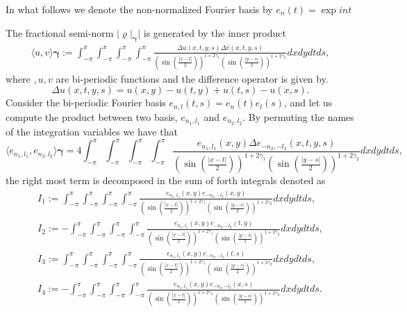 \documentclass{article}
\begin{document}
In what follows we denote the non-normalized Fourier basis by $e_n(t) = \exp{i n t }$

The fractional semi-norm $|\varrho|_{\mathbf{\gamma}}|$ is generated by the inner product 
\begin{align*}
\langle u , v \rangle{\mathbf{\gamma}} := \int_{-\pi}^{\pi}  \int_{-\pi}^{\pi} \int_{-\pi}^{\pi}\int_{-\pi}^{\pi} \frac{\Delta u (x,t,y,s)\Delta \overline{v} (x,t,y,s) }
{\left(\sin\left(\frac{|x-t|}{2}\right)\right)^{1+2\gamma_1}\left(\sin\left(\frac{|y-s|}{2}\right)\right)^{1+2\gamma_2}}dx dy dt ds, 
\end{align*}
where $,u,v$ are bi-periodic functions and the difference operator is given by.
$$\Delta u(x,t,y,s) = u(x,y)-u(t,y)+u(t,s)-u(x,s).$$
Consider the bi-periodic Fourier basis 
$e_{n,l}(t,s) = e_n(t)e_l(s)$, and let us compute the product between two basis, $e_{n_1,l_1}$ and $e_{n_2,l_2}$.  By permuting the names of the integration variables we have that 
$$\langle e_{n_1,l_1} , e_{n_2,l_2} \rangle{\mathbf{\gamma}}  =
4 \int_{-\pi}^{\pi}  \int_{-\pi}^{\pi} \int_{-\pi}^{\pi}\int_{-\pi}^{\pi} \frac{e_{n_1,l_1}(x,y)\Delta e_{-n_2,-l_2} (x,t,y,s) }
{\left(\sin\left(\frac{|x-t|}{2}\right)\right)^{1+2\gamma_1}\left(\sin\left(\frac{|y-s|}{2}\right)\right)^{1+2\gamma_2}}dx dy dt ds, 
$$
the right most term is decomposed in the sum of forth integrals denoted as
\begin{align*}
I_1 := \int_{-\pi}^{\pi}\int_{-\pi}^{\pi} \int_{-\pi}^{\pi}\int_{-\pi}^{\pi} \frac{e_{n_1,l_1}(x,y)e_{-n_2,-l_2} (x,y) }
{\left(\sin\left(\frac{|x-t|}{2}\right)\right)^{1+2\gamma_1}\left(\sin\left(\frac{|y-s|}{2}\right)\right)^{1+2\gamma_2}}dx dy dt ds,\\
I_2 :=  -\int_{-\pi}^{\pi}\int_{-\pi}^{\pi} \int_{-\pi}^{\pi}\int_{-\pi}^{\pi} \frac{e_{n_1,l_1}(x,y)e_{-n_2,-l_2} (t,y) }
{\left(\sin\left(\frac{|x-t|}{2}\right)\right)^{1+2\gamma_1}\left(\sin\left(\frac{|y-s|}{2}\right)\right)^{1+2\gamma_2}}dx dy dt ds,\\
I_3 := \int_{-\pi}^{\pi}\int_{-\pi}^{\pi} \int_{-\pi}^{\pi}\int_{-\pi}^{\pi} \frac{e_{n_1,l_1}(x,y)e_{-n_2,-l_2} (t,s) }
{\left(\sin\left(\frac{|x-t|}{2}\right)\right)^{1+2\gamma_1}\left(\sin\left(\frac{|y-s|}{2}\right)\right)^{1+2\gamma_2}}dx dy dt ds,\\
I_4 := -\int_{-\pi}^{\pi}\int_{-\pi}^{\pi} \int_{-\pi}^{\pi}\int_{-\pi}^{\pi} \frac{e_{n_1,l_1}(x,y)e_{-n_2,-l_2} (x,s) }
{\left(\sin\left(\frac{|x-t|}{2}\right)\right)^{1+2\gamma_1}\left(\sin\left(\frac{|y-s|}{2}\right)\right)^{1+2\gamma_2}}dx dy dt ds.
\end{align*}
\end{document}
